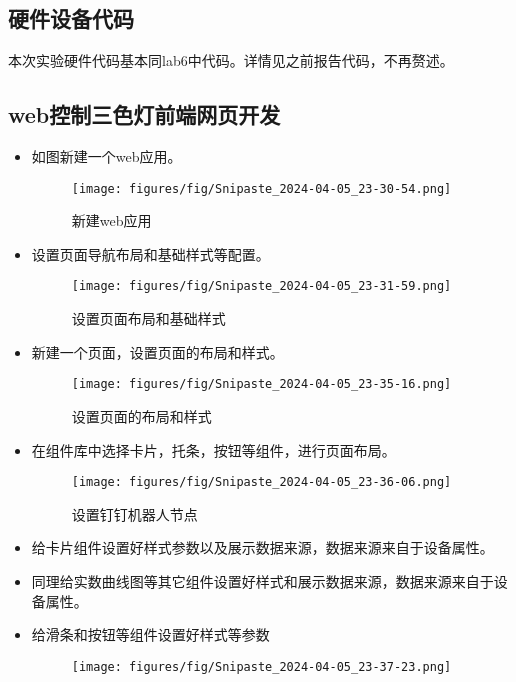 \documentclass[12pt,hyperref,a4paper,UTF8]{ctexart}
\begin{document}
\subsection{硬件设备代码}
本次实验硬件代码基本同lab6中代码。详情见之前报告代码，不再赘述。

\subsection{web控制三色灯前端网页开发}

\begin{itemize}
  \item 如图新建一个web应用。
  \begin{figure}[H]
    \centering
    \texttt{[image: figures/fig/Snipaste\_2024-04-05\_23-30-54.png]}
    \caption{新建web应用}
    \label{fig:enter-label}
  \end{figure}
  \item 设置页面导航布局和基础样式等配置。
  \begin{figure}[H]
    \centering
    \texttt{[image: figures/fig/Snipaste\_2024-04-05\_23-31-59.png]}
    \caption{设置页面布局和基础样式}
    \label{fig:enter-label}
  \end{figure}
  \item 新建一个页面，设置页面的布局和样式。
  \begin{figure}[H]
    \centering
    \texttt{[image: figures/fig/Snipaste\_2024-04-05\_23-35-16.png]}
    \caption{设置页面的布局和样式}
    \label{fig:enter-label}
  \end{figure}
  \item 在组件库中选择卡片，托条，按钮等组件，进行页面布局。
  \begin{figure}[H]
    \centering
    \texttt{[image: figures/fig/Snipaste\_2024-04-05\_23-36-06.png]}
    \caption{设置钉钉机器人节点}
    \label{fig:enter-label}
  \end{figure}
  \item 给卡片组件设置好样式参数以及展示数据来源，数据来源来自于设备属性。
  \item 同理给实数曲线图等其它组件设置好样式和展示数据来源，数据来源来自于设备属性。
  \item 给滑条和按钮等组件设置好样式等参数
  \begin{figure}[H]
    \centering
    \begin{minipage}{.22\textwidth}
      \centering
      \texttt{[image: figures/fig/Snipaste\_2024-04-05\_23-37-23.png]}

\end{minipage}
\end{figure}
\end{itemize}
\end{document}
